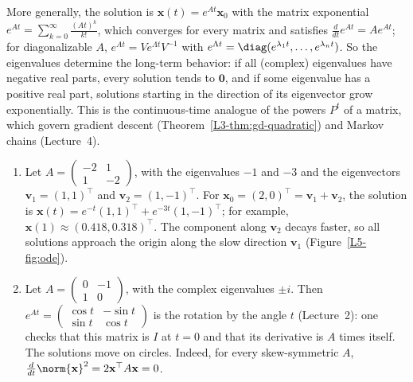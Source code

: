 More generally, the solution is $\mathbf{x}(t) = e^{At}\mathbf{x}_0$ with the matrix exponential $e^{At} = \sum_{k=0}^\infty \frac{(At)^k}{k!}$, which converges for every matrix and satisfies $\frac{d}{dt}e^{At} = Ae^{At}$; for diagonalizable $A$, $e^{At} = Ve^{\Lambda t}V^{-1}$ with $e^{\Lambda t} = \diag(e^{\lambda_1 t}, \ldots, e^{\lambda_n t})$. So the eigenvalues determine the long-term behavior: if all (complex) eigenvalues have negative real parts, every solution tends to $\mathbf{0}$, and if some eigenvalue has a positive real part, solutions starting in the direction of its eigenvector grow exponentially. This is the continuous-time analogue of the powers $P^t$ of a matrix, which govern gradient descent (Theorem~\ref{L3-thm:gd-quadratic}) and Markov chains (Lecture~4).

\begin{example}\label{L5-ex:linear-ode}
    \begin{enumerate}
        \item Let $A = \begin{pmatrix} -2 & 1 \\ 1 & -2 \end{pmatrix}$, with the eigenvalues $-1$ and $-3$ and the eigenvectors $\mathbf{v}_1 = (1, 1)^\top$ and $\mathbf{v}_2 = (1, -1)^\top$. For $\mathbf{x}_0 = (2, 0)^\top = \mathbf{v}_1 + \mathbf{v}_2$, the solution is $\mathbf{x}(t) = e^{-t}(1, 1)^\top + e^{-3t}(1, -1)^\top$; for example, $\mathbf{x}(1) \approx (0.418, 0.318)^\top$. The component along $\mathbf{v}_2$ decays faster, so all solutions approach the origin along the slow direction $\mathbf{v}_1$ (Figure~\ref{L5-fig:ode}).
        \item Let $A = \begin{pmatrix} 0 & -1 \\ 1 & 0 \end{pmatrix}$, with the complex eigenvalues $\pm i$. Then $e^{At} = \begin{pmatrix} \cos t & -\sin t \\ \sin t & \cos t \end{pmatrix}$ is the rotation by the angle $t$ (Lecture~2): one checks that this matrix is $I$ at $t = 0$ and that its derivative is $A$ times itself. The solutions move on circles. Indeed, for every skew-symmetric $A$, $\frac{d}{dt}\norm{\mathbf{x}}^2 = 2\mathbf{x}^\top A\mathbf{x} = 0$.
    \end{enumerate}
\end{example}

